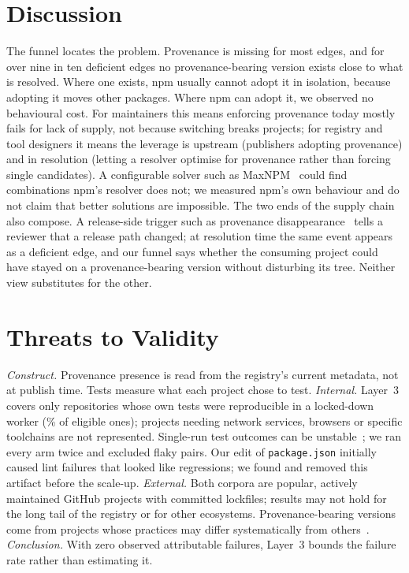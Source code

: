 \documentclass[conference]{IEEEtran}
\begin{document}
\section{Discussion}
The funnel locates the problem. Provenance is missing for most edges, and for
over nine in ten deficient edges no provenance-bearing version exists close
to what is resolved. Where one exists, npm usually cannot adopt it in
isolation, because adopting it moves other packages. Where npm can adopt
it, we observed no behavioural cost. For maintainers this means enforcing
provenance today mostly fails for lack of supply, not because switching
breaks projects; for registry and tool designers it means the leverage is
upstream (publishers adopting provenance) and in resolution (letting a
resolver optimise for provenance rather than forcing single candidates). A
configurable solver such as MaxNPM~\cite{pinckney2023maxnpm} could find
combinations npm's resolver does not; we measured npm's own behaviour and do
not claim that better solutions are impossible.
The two ends of the supply chain also compose. A release-side trigger such as
provenance disappearance~\cite{santos2026authority} tells a reviewer that a
release path changed; at resolution time the same event appears as a
deficient edge, and our funnel says whether the consuming project could have
stayed on a provenance-bearing version without disturbing its tree. Neither
view substitutes for the other.

\section{Threats to Validity}
\emph{Construct.} Provenance presence is read from the registry's current
metadata, not at publish time. Tests measure what each project chose to test.
\emph{Internal.} Layer~3 covers only repositories whose own tests were
reproducible in a locked-down worker (\STestablePct\% of eligible ones);
projects needing network services, browsers or specific toolchains are not
represented. Single-run test outcomes can be unstable~\cite{maksymiuk2026reproducible};
we ran every arm twice and excluded flaky pairs. Our edit of
\texttt{package.json} initially caused lint failures that looked like
regressions; we found and removed this artifact before the scale-up.
\emph{External.} Both corpora are popular, actively maintained GitHub
projects with committed lockfiles; results may not hold for the long tail of
the registry or for other ecosystems. Provenance-bearing versions come from
projects whose practices may differ systematically from others~\cite{solarin2026verifiability}.
\emph{Conclusion.} With zero observed attributable failures, Layer~3 bounds
the failure rate rather than estimating it.
\end{document}

